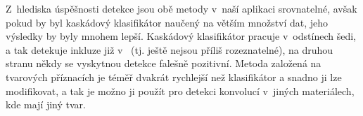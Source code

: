 \documentclass[12pt, a4paper]{report}
\begin{document}
Z~hlediska úspěšnosti detekce jsou obě metody v~naší aplikaci srovnatelné, avšak pokud by byl kaskádový klasifikátor naučený na větším množství dat, jeho výsledky by byly mnohem lepší. Kaskádový klasifikátor pracuje v~odstínech šedi, a tak detekuje inkluze již v~ (tj. ještě nejsou příliš rozeznatelné), na druhou stranu někdy se vyskytnou detekce falešně pozitivní. Metoda založená na tvarových příznacích je téměř dvakrát rychlejší než klasifikátor a snadno ji lze modifikovat, a tak je možno ji použít pro detekci konvolucí v~jiných materiálech, kde mají jiný tvar.
\end{document}
